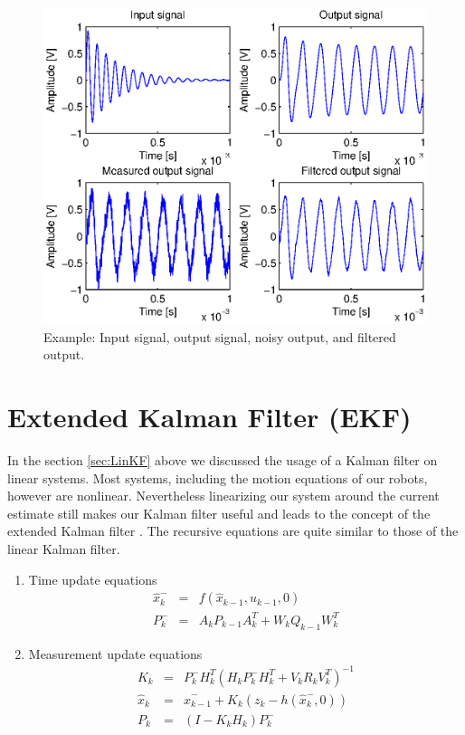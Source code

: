 \begin{figure}[htbp]
	\centering
    	\includegraphics[width=12cm]{./3_KalmanFilterTheory/KFchart.eps}
  	\caption{Example: Input signal, output signal, noisy output, and filtered output.}
  	\label{fig:KFchart}
\end{figure}

\section{Extended Kalman Filter (EKF)}

In the section \ref{sec:LinKF} above we discussed the usage of a Kalman filter on linear systems. Most systems, including the motion equations of our robots, however are nonlinear. Nevertheless linearizing our system around the current estimate still makes our Kalman filter useful and leads to the concept of the extended Kalman filter \cite{IntroKF}. The recursive equations are quite similar to those of the linear Kalman filter.
\newline
\begin{enumerate}
	\item Time update equations
	\begin{eqnarray}\label{TupEqEKF}
    			\hat{x}_{k}^- &=& f(\hat{x}_{k-1},u_{k-1},0) \\
    			P_{k}^{-} &=& A_kP_{k-1}A_k^T+W_k Q_{k-1} W_k^T \nonumber
	\end{eqnarray}
	\item Measurement update equations
	\begin{eqnarray}\label{MupEqEKF}
    			K_{k} &=& P_{k}^- H_k^T(H_k P_k^- H_k^T+V_k R_k V_k^T)^{-1} \nonumber\\
    			\hat{x}_k &=& \hat{x}_{k-1}^- + K_{k}(z_k - h(\hat{x}_k^-, 0)) \\
			P_k &=& (I-K_k H_k)P_k^- \nonumber
	\end{eqnarray}
\end{enumerate}

